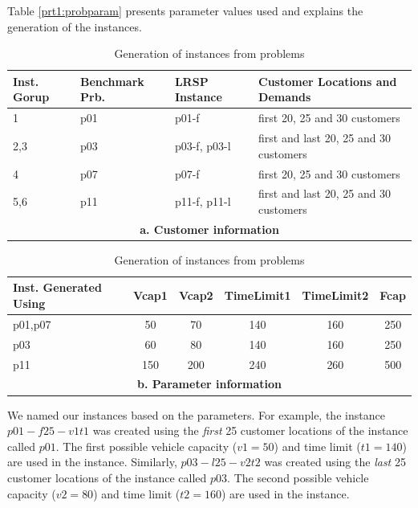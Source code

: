 Table \ref{prt1:probparam} presents parameter values used and explains the generation of the instances.   
\begin {table}[h]
\begin{center}
\caption {Generation of instances from \citet{Cordeau2} problems} \label{part1:probparam}
\begin {tabular}[t]{llll} 
Inst. Gorup	&	Benchmark Prb.	&	LRSP Instance 	&	Customer Locations and Demands	\\\hline
1	&	p01	&	p01-f	&	first 20, 25 and 30 customers	\\
2,3	&	p03	&	p03-f, p03-l	&	first and last 20, 25 and 30 customers	\\
4	&	p07	&	p07-f	&	first 20, 25 and 30 customers	\\
5,6	&	p11	&	p11-f, p11-l	&	first and last 20, 25 and 30 customers	\\\hline
\multicolumn{4}{c}{{\bf a. Customer information }} 
\end{tabular}
\begin {tabular}[t]{lccccc} 
Inst. Generated Using & Vcap1	& Vcap2	& TimeLimit1 &	TimeLimit2 & Fcap\\\hline
p01,p07	& 	50	&	70	&	140	&	160	&	250 \\
p03	&	60	&	80	&	140	&	160	&	250\\
p11	&	150	&	200	&	240	&	260	&	500\\\hline
\multicolumn{6}{c}{{\bf b. Parameter information }} 
\end{tabular}
\end{center}
\end {table} 

We named our instances based on the parameters. For example, the instance 
$p01-f25-v1t1$ was created using the {\em first} 25 customer locations of  
the \citet{Cordeau2} instance called $p01$. The first possible vehicle capacity ($v1=50$) and time limit
($t1=140$) are used in the instance. Similarly, $p03-l25-v2t2$ was created using the {\em last} 
25 customer locations of the \citet{Cordeau2} instance called $p03$. The second possible vehicle 
capacity ($v2=80$) and time limit ($t2=160$) are used in the instance.  

